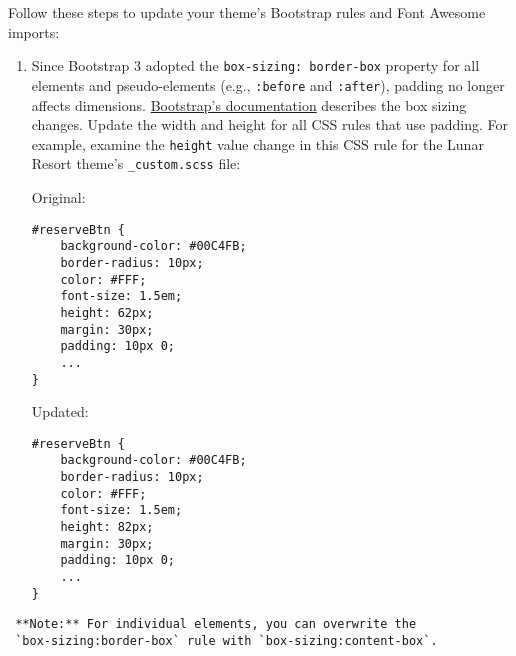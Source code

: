 Follow these steps to update your theme's Bootstrap rules and Font
Awesome imports:

\begin{enumerate}
\def\labelenumi{\arabic{enumi}.}
\item
  Since Bootstrap 3 adopted the \texttt{box-sizing:\ border-box}
  property for all elements and pseudo-elements (e.g., \texttt{:before}
  and \texttt{:after}), padding no longer affects dimensions.
  \href{https://getbootstrap.com/docs/3.3/css/\#less-mixins-box-sizing}{Bootstrap's
  documentation} describes the box sizing changes. Update the width and
  height for all CSS rules that use padding. For example, examine the
  \texttt{height} value change in this CSS rule for the Lunar Resort
  theme's \texttt{\_custom.scss} file:

  Original:

\begin{verbatim}
#reserveBtn {
    background-color: #00C4FB;
    border-radius: 10px;
    color: #FFF;
    font-size: 1.5em;
    height: 62px;
    margin: 30px;
    padding: 10px 0;
    ...
}
\end{verbatim}

  Updated:

\begin{verbatim}
#reserveBtn {
    background-color: #00C4FB;
    border-radius: 10px;
    color: #FFF;
    font-size: 1.5em;
    height: 82px;
    margin: 30px;
    padding: 10px 0;
    ...
}
\end{verbatim}
\end{enumerate}

\noindent\hrulefill

\begin{verbatim}
 **Note:** For individual elements, you can overwrite the 
 `box-sizing:border-box` rule with `box-sizing:content-box`. 
\end{verbatim}

\noindent\hrulefill

